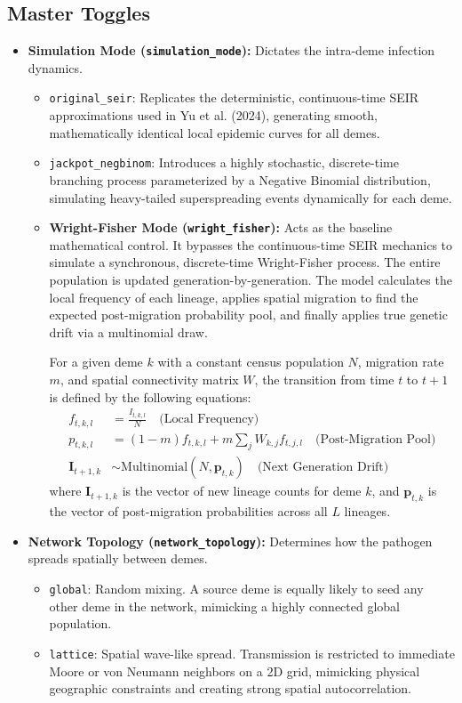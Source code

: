 \documentclass[12pt]{article}
\begin{document}
\subsection{Master Toggles}
\begin{itemize}
    \item \textbf{Simulation Mode (\texttt{simulation\_mode}):} Dictates the intra-deme infection dynamics. 
    \begin{itemize}
        \item \texttt{original\_seir}: Replicates the deterministic, continuous-time SEIR approximations used in Yu et al. (2024), generating smooth, mathematically identical local epidemic curves for all demes.
        \item \texttt{jackpot\_negbinom}: Introduces a highly stochastic, discrete-time branching process parameterized by a Negative Binomial distribution, simulating heavy-tailed superspreading events dynamically for each deme.
        \item \textbf{Wright-Fisher Mode (\texttt{wright\_fisher}):} Acts as the baseline mathematical control. It bypasses the continuous-time SEIR mechanics to simulate a synchronous, discrete-time Wright-Fisher process. The entire population is updated generation-by-generation. The model calculates the local frequency of each lineage, applies spatial migration to find the expected post-migration probability pool, and finally applies true genetic drift via a multinomial draw. 
    
    For a given deme $k$ with a constant census population $N$, migration rate $m$, and spatial connectivity matrix $W$, the transition from time $t$ to $t+1$ is defined by the following equations:
    \begin{align}
        f_{t, k, l} &= \frac{I_{t, k, l}}{N} \quad \text{(Local Frequency)} \\
        p_{t, k, l} &= (1 - m) f_{t, k, l} + m \sum_{j} W_{k, j} f_{t, j, l} \quad \text{(Post-Migration Pool)} \\
        \mathbf{I}_{t+1, k} &\sim \text{Multinomial}(N, \mathbf{p}_{t, k}) \quad \text{(Next Generation Drift)}
    \end{align}
    where $\mathbf{I}_{t+1, k}$ is the vector of new lineage counts for deme $k$, and $\mathbf{p}_{t, k}$ is the vector of post-migration probabilities across all $L$ lineages.
    \end{itemize}
    \item \textbf{Network Topology (\texttt{network\_topology}):} Determines how the pathogen spreads spatially between demes.
    \begin{itemize}
        \item \texttt{global}: Random mixing. A source deme is equally likely to seed any other deme in the network, mimicking a highly connected global population.
        \item \texttt{lattice}: Spatial wave-like spread. Transmission is restricted to immediate Moore or von Neumann neighbors on a 2D grid, mimicking physical geographic constraints and creating strong spatial autocorrelation.
    \end{itemize}
\end{itemize}
\end{document}

